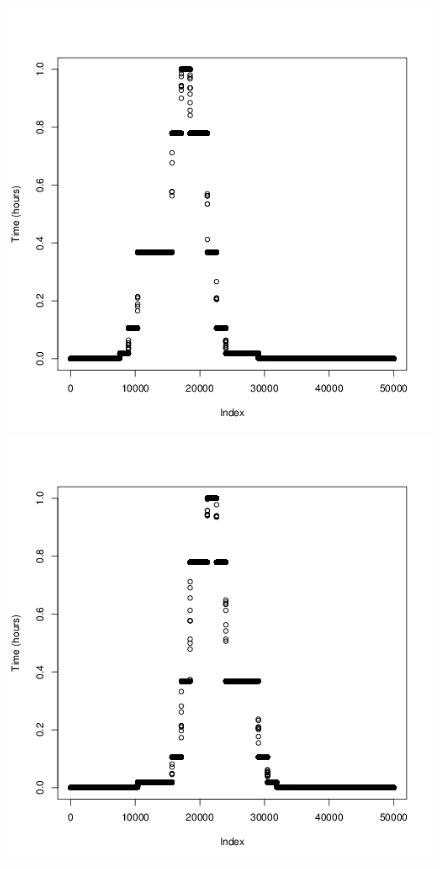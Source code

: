 \documentclass[a4paper, 12pt]{article}
\begin{document}
\begin{figure}[H]
\begin{minipage}[]{0.2\textwidth}
        \end{minipage}
        \begin{minipage}[]{0.2\textwidth}
            \includegraphics[width=\textwidth]{share/3_time.png}
        \end{minipage}
        \begin{minipage}[]{0.2\textwidth}
            \includegraphics[width=\textwidth]{share/4_time.png}

\end{minipage}
\end{figure}
\end{document}
